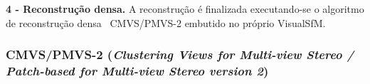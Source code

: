 


\noindent\textbf{4 - Reconstrução densa.} A reconstrução é finalizada
executando-se o algoritmo de reconstrução densa~\cite{gavadense} CMVS/PMVS-2 embutido
no próprio VisualSfM.

\subsubsection*{CMVS/PMVS-2 (\emph{Clustering Views for Multi-view Stereo /
Patch-based for Multi-view Stereo version 2})}

